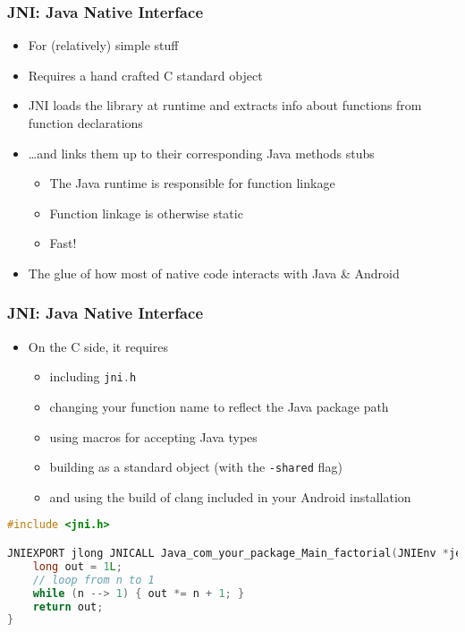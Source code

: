 \documentclass[10pt,mathserif]{beamer}
\begin{document}
	\begin{frame}
		\frametitle{JNI: Java Native Interface}

		\begin{itemize}
			\item For (relatively) simple stuff
			\item Requires a hand crafted C standard object
			\item JNI loads the library at runtime and extracts info about functions from function declarations
			\item \dots and links them up to their corresponding Java methods stubs
			\begin{itemize}
				\item The Java runtime is responsible for function linkage
				\item Function linkage is otherwise static
				\item Fast!
			\end{itemize}
			\item The glue of how most of native code interacts with Java \& Android
		\end{itemize}

	\end{frame}

	\begin{frame}[fragile]
		\frametitle{JNI: Java Native Interface}

		\begin{itemize}
			\item On the C side, it requires
			\begin{itemize}
				\item including \lstinline[language=c]{jni.h}
				\item changing your function name to reflect the Java package path
				\item using macros for accepting Java types
				\item building as a standard object (with the \lstinline{-shared} flag)
				\item and using the build of clang included in your Android installation
			\end{itemize}
		\end{itemize}

		\begin{lstlisting}[language=c]
#include <jni.h>

JNIEXPORT jlong JNICALL Java_com_your_package_Main_factorial(JNIEnv *jenv, jint n) {
	long out = 1L;
	// loop from n to 1
	while (n --> 1) { out *= n + 1; }
	return out;
}
		\end{lstlisting}
	\end{frame}
\end{document}
